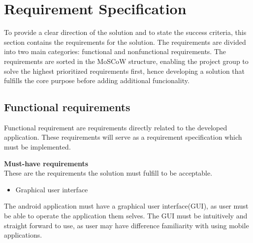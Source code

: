 \section{Requirement Specification}
To provide a clear direction of the solution and to state the success criteria, this section contains the requirements for the solution. The requirements are divided into two main categories: functional and nonfunctional requirements. The requirements are sorted in the MoSCoW structure, enabling the project group to solve the highest prioritized requirements first, hence developing a solution that fulfills the core purpose before adding additional funcionality.


\iffalse
\begin{itemize}
	\item Opret brugere, og bestem disposition af bil
	\item Registrere all selv kørte strækninger
	\item Sammenlign med andre med (ca) samme start og sluts position
	\item Udregn strækning mellem sammenligningerne. 
	\item Automatisk forslag om ridesharing mellem pendlere, som tit rejser fra og til samme område på samme tid, hvor tid og penge kunne spares.
	\item Reservation af køre [fra, til, klokkeslet] (normal carpool)
\end{itemize}
\fi


\subsection{Functional requirements}
Functional requirement are requirements directly related to the developed application. These requirements will serve as a requirement specification which must be implemented.

\textbf{Must-have requirements}\\
These are the requirements the solution must fulfill to be acceptable.

\begin{itemize}
	\item Graphical user interface
\end{itemize}
The android application must have a graphical user interface(GUI), as user must be able to operate the application them selves. The GUI must be intuitively and straight forward to use, as user may have difference familiarity with using mobile applications.

